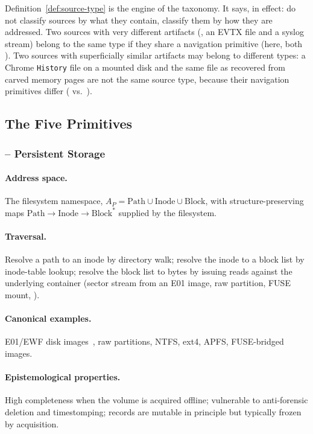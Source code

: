 Definition~\ref{def:source-type} is the engine of the taxonomy. It says, in
effect: do not classify sources by what they contain, classify them by how
they are addressed. Two sources with very different artifacts (\eg{}, an
EVTX file and a syslog stream) belong to the same type if they share a
navigation primitive (here, both ). Two sources with superficially
similar artifacts may belong to different types: a Chrome \texttt{History}
file on a mounted disk and the same file as recovered from carved memory
pages are not the same source type, because their navigation primitives
differ ( vs.\ ).

\subsection{The Five Primitives}

\subsubsection{ -- Persistent Storage}

\paragraph{Address space.} The filesystem namespace, $A_{P} = \mathrm{Path}
\cup \mathrm{Inode} \cup \mathrm{Block}$, with structure-preserving maps
$\mathrm{Path} \to \mathrm{Inode} \to \mathrm{Block}^{*}$ supplied by the
filesystem.
\paragraph{Traversal.} Resolve a path to an inode by directory walk; resolve
the inode to a block list by inode-table lookup; resolve the block list to
bytes by issuing reads against the underlying container (sector stream from
an E01 image, raw partition, FUSE mount, \etc{}).
\paragraph{Canonical examples.} E01/EWF disk images~\cite{ewf2011}, raw
partitions, NTFS, ext4, APFS, FUSE-bridged images.
\paragraph{Epistemological properties.} High completeness when the volume is
acquired offline; vulnerable to anti-forensic deletion and timestomping;
records are mutable in principle but typically frozen by acquisition.


